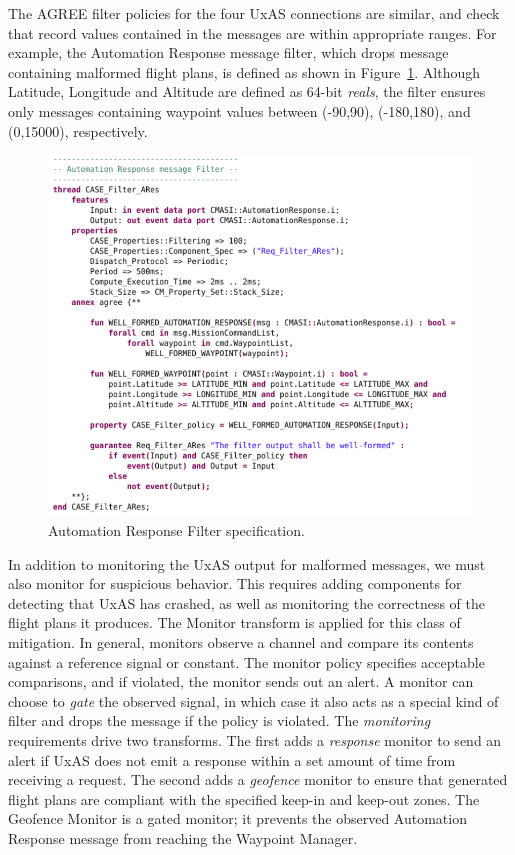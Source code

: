 The AGREE filter policies for the four UxAS connections are similar, and check that record values contained in the messages are within appropriate ranges.  For example, the Automation Response message filter, which drops message containing malformed flight plans, is defined as shown in Figure~\ref{fig:automation-response-filter}.  Although Latitude, Longitude and Altitude are defined as 64-bit \textit{reals}, the filter ensures only messages containing waypoint values between (-90,90), (-180,180), and (0,15000), respectively. 

\begin{figure}[h]
	\centering
	\includegraphics[width=1\columnwidth]{figs/automation-response-filter.png}
	\caption{Automation Response Filter specification.} 
	\label{fig:automation-response-filter} 
\end{figure}

In addition to monitoring the UxAS output for malformed messages, we must also monitor for suspicious behavior.  This requires adding components for detecting that UxAS has crashed, as well as monitoring the correctness of the flight plans it produces.  The Monitor transform is applied for this class of mitigation.  In general, monitors observe a channel and compare its contents against a reference signal or constant.  The monitor policy specifies acceptable comparisons, and if violated, the monitor sends out an alert.  A monitor can choose to \textit{gate} the observed signal, in which case it also acts as a special kind of filter and drops the message if the policy is violated.  The \textit{monitoring} requirements drive two transforms.  The first adds a \textit{response} monitor to send an alert if UxAS does not emit a response within a set amount of time from receiving a request.  The second adds a \textit{geofence} monitor to ensure that generated flight plans are compliant with the specified keep-in and keep-out zones.  The Geofence Monitor is a gated monitor; it prevents the observed Automation Response message from reaching the Waypoint Manager. 

